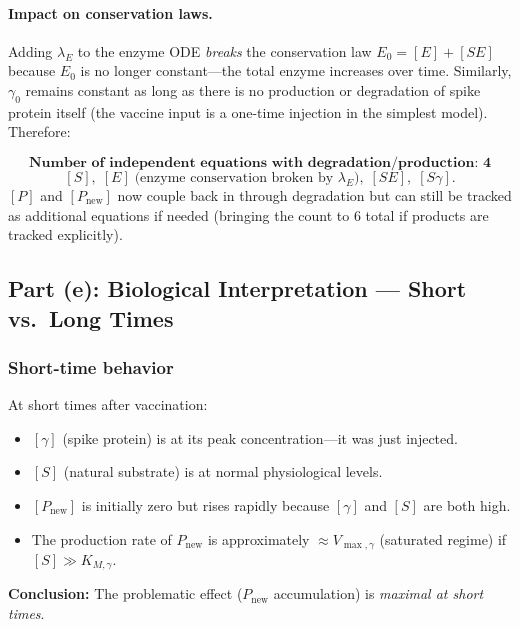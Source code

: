 \documentclass[12pt]{article}
\newcommand{\KMg}{K_{M,\gamma}}
\begin{document}
\paragraph{Impact on conservation laws.}
Adding $\lambda_E$ to the enzyme ODE \emph{breaks} the conservation law $E_0 = [E]+[SE]$
because $E_0$ is no longer constant---the total enzyme increases over time. Similarly,
$\gamma_0$ remains constant as long as there is no production or degradation of spike protein
itself (the vaccine input is a one-time injection in the simplest model). Therefore:

\begin{mdframed}[style=keyresult]
\[
  \boxed{\textbf{Number of independent equations with degradation/production: 4}}
\]
\[
[S],\;[E] \;\text{(enzyme conservation broken by }\lambda_E),\;[SE],\;[S\gamma].
\]
$[P]$ and $[P_{\text{new}}]$ now couple back in through degradation but can still be tracked
as additional equations if needed (bringing the count to 6 total if products are tracked
explicitly).
\end{mdframed}

\medskip

\subsection*{Part (e): Biological Interpretation --- Short vs.\ Long Times}

\subsubsection*{Short-time behavior}

At short times after vaccination:
\begin{itemize}
  \item $[\gamma]$ (spike protein) is at its peak concentration---it was just injected.
  \item $[S]$ (natural substrate) is at normal physiological levels.
  \item $[P_{\text{new}}]$ is initially zero but rises rapidly because $[\gamma]$ and $[S]$ are both high.
  \item The production rate of $P_{\text{new}}$ is approximately $\approx V_{\max,\gamma}$ (saturated
        regime) if $[S] \gg \KMg$.
\end{itemize}
\textbf{Conclusion:} The problematic effect ($P_{\text{new}}$ accumulation) is \emph{maximal at short
times}.
\end{document}
